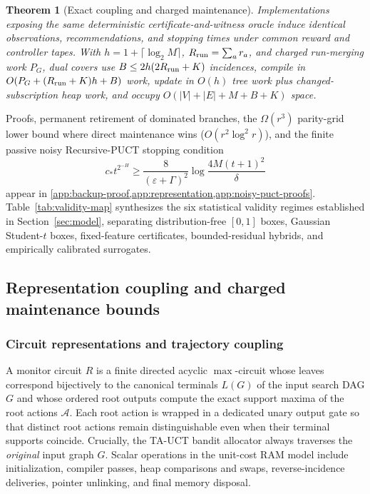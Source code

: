 \documentclass{article}
\theoremstyle{plain}
\newtheorem{theorem}{Theorem}[section]
\theoremstyle{definition}
\begin{document}
\begin{theorem}[Exact coupling and charged maintenance]
\label{thm:adaptive-oracle-coupling}\label{thm:charged-dual-cover}
Implementations exposing the same deterministic certificate-and-witness oracle induce identical observations, recommendations, and stopping times under common reward and controller tapes. With $h=1+\lceil\log_2M\rceil$, $R_{\rm run}=\sum_a r_a$, and charged run-merging work $P_G$, dual covers use $B\le2h(2R_{\rm run}+K)$ incidences, compile in $O(P_G+(R_{\rm run}+K)h+B)$ work, update in $O(h)$ tree work plus changed-subscription heap work, and occupy $O(|V|+|E|+M+B+K)$ space.
\end{theorem}

Proofs, permanent retirement of dominated branches, the $\Omega(r^3)$ parity-grid lower bound where direct maintenance wins ($O(r^2\log^2 r)$), and the finite passive noisy Recursive-PUCT stopping condition
\begin{equation}
 c_*t^{2^{-H}}\ge\frac{8}{(\varepsilon+\Gamma)^2}\log\frac{4M(t+1)^2}{\delta}
 \label{eq:puct-noisy-condition}
\end{equation}
appear in \cref{app:backup-proof,app:representation,app:noisy-puct-proofs}. Table~\ref{tab:validity-map} synthesizes the six statistical validity regimes established in Section~\ref{sec:model}, separating distribution-free $[0,1]$ boxes, Gaussian Student-$t$ boxes, fixed-feature certificates, bounded-residual hybrids, and empirically calibrated surrogates.


\subsection{Representation coupling and charged maintenance bounds}
\label{app:representation}

\subsubsection{Circuit representations and trajectory coupling}

A monitor circuit $R$ is a finite directed acyclic $\max$-circuit whose leaves correspond bijectively to the canonical terminals $L(G)$ of the input search DAG $G$ and whose ordered root outputs compute the exact support maxima of the root actions $\mathcal{A}$. Each root action is wrapped in a dedicated unary output gate so that distinct root actions remain distinguishable even when their terminal supports coincide. Crucially, the TA-UCT bandit allocator always traverses the \emph{original} input graph $G$. Scalar operations in the unit-cost RAM model include initialization, compiler passes, heap comparisons and swaps, reverse-incidence deliveries, pointer unlinking, and final memory disposal.
\end{document}
